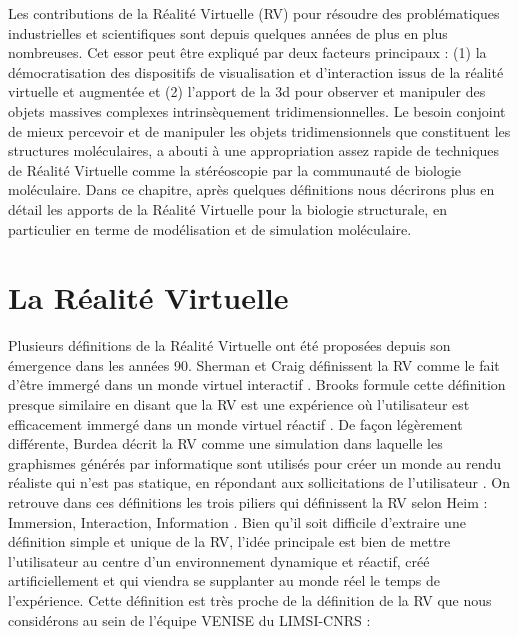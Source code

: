 Les contributions de la Réalité Virtuelle (RV) pour résoudre des problématiques industrielles et scientifiques sont depuis quelques années de plus en plus nombreuses. Cet essor peut être expliqué par deux facteurs principaux : (1) la démocratisation des dispositifs de visualisation et d'interaction issus de la réalité virtuelle et augmentée et (2) l'apport de la 3d pour observer et manipuler des objets massives complexes intrinsèquement tridimensionnelles. Le besoin conjoint de mieux percevoir et de manipuler les objets tridimensionnels que constituent les structures moléculaires, a abouti à une appropriation assez rapide de techniques de Réalité Virtuelle comme la stéréoscopie par la communauté de biologie moléculaire. Dans ce chapitre, après quelques définitions nous décrirons plus en détail les apports de la Réalité Virtuelle pour la biologie structurale, en particulier en terme de modélisation et de simulation moléculaire.

\section{La Réalité Virtuelle} \label{RV_science}


Plusieurs définitions de la Réalité Virtuelle ont été proposées depuis son émergence dans les années 90. Sherman et Craig définissent la RV comme le fait d'être immergé dans un monde virtuel interactif \cite{sherman2002understanding}. Brooks formule cette définition presque similaire en disant que la RV est une expérience où l'utilisateur est efficacement immergé dans un monde virtuel réactif \cite{brooks1999s}. De façon légèrement différente, Burdea décrit la RV comme une simulation dans laquelle les graphismes générés par informatique sont utilisés pour créer un monde au rendu réaliste qui n'est pas statique, en répondant aux sollicitations de l'utilisateur \cite{burdea2003virtual}. On retrouve dans ces définitions les trois piliers qui définissent la RV selon Heim : Immersion, Interaction, Information \cite{heim1998virtual}. Bien qu'il soit difficile d'extraire une définition simple et unique de la RV, l'idée principale est bien de mettre l'utilisateur au centre d'un environnement dynamique et réactif, créé artificiellement et qui viendra se supplanter au monde réel le temps de l'expérience. Cette définition est très proche de la définition de la RV que nous considérons au sein de l'équipe VENISE du LIMSI-CNRS \cite{bourdot_patrick_reconstruction_2002}:

